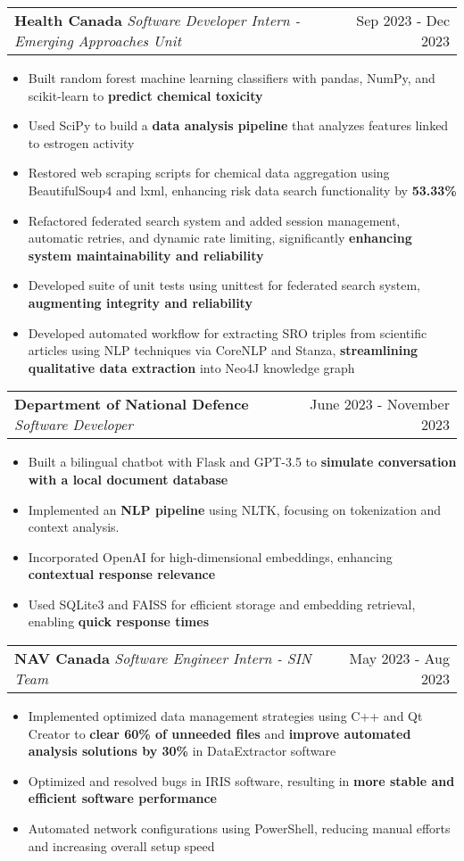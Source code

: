 \documentclass[letterpaper,11pt]{article}
\makeatletter
\newcommand{\resumeItem}[1]{
  \item\small{
    {#1 \vspace{-2pt}}
  }
}
\newcommand{\resumeSubheading}[3]{
    \item
    \begin{tabular*}{0.97\textwidth}[t]{l@{\extracolsep{\fill}}r}
      \textbf{#1} \textbar \textit{ #2} & #3 \\
    \end{tabular*}\vspace{-4.5pt}
}
\newcommand{\resumeItemListStart}{\begin{itemize}}
\newcommand{\resumeItemListEnd}{\end{itemize}\vspace{-5pt}}
\makeatother
\begin{document}
    \resumeSubheading
      {Health Canada}{Software Developer Intern - Emerging Approaches Unit}{Sep 2023 - Dec 2023}
      \resumeItemListStart
        \resumeItem{Built random forest machine learning classifiers with pandas, NumPy, and scikit-learn to \textbf{predict chemical toxicity}}
        \resumeItem{Used SciPy to build a \textbf{data analysis pipeline} that analyzes features linked to estrogen activity}
        \resumeItem{Restored web scraping scripts for chemical data aggregation using BeautifulSoup4 and lxml, enhancing risk data search functionality by \textbf{53.33\%}}
        \resumeItem{Refactored federated search system and added session management, automatic retries, and dynamic rate limiting, significantly \textbf{enhancing system maintainability and reliability}}
        \resumeItem{Developed suite of unit tests using unittest for federated search system, \textbf{augmenting integrity and reliability}}
        \resumeItem{Developed automated workflow for extracting SRO triples from scientific articles using NLP techniques via CoreNLP and Stanza, \textbf{streamlining qualitative data extraction} into Neo4J knowledge graph}
      \resumeItemListEnd

    \resumeSubheading
    {Department of National Defence}{Software Developer}{June 2023 - November 2023}
      \resumeItemListStart
        \resumeItem{Built a bilingual chatbot with Flask and GPT-3.5 to \textbf{simulate conversation with a local document database}}
        \resumeItem{Implemented an \textbf{NLP pipeline} using NLTK, focusing on tokenization and context analysis.}
        \resumeItem{Incorporated OpenAI for high-dimensional embeddings, enhancing \textbf{contextual response relevance}}
        \resumeItem{Used SQLite3 and FAISS for efficient storage and embedding retrieval, enabling \textbf{quick response times}}
      \resumeItemListEnd

    \resumeSubheading
    {NAV Canada}{Software Engineer Intern - SIN Team}{May 2023 - Aug 2023}
      \resumeItemListStart
        \resumeItem{Implemented optimized data management strategies using C++ and Qt Creator to \textbf{clear 60\% of unneeded files} and \textbf{improve automated analysis solutions by 30\%} in DataExtractor software}
        \resumeItem{Optimized and resolved bugs in IRIS software, resulting in \textbf{more stable and efficient software performance}}
        \resumeItem{Automated network configurations using PowerShell, reducing manual efforts and increasing overall setup speed}
      \resumeItemListEnd
\end{document}
